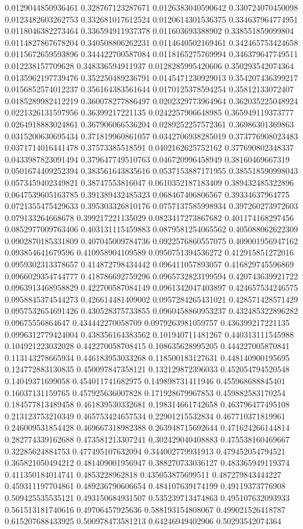 \begin{table}
\begin{tabu}
\begin{sparkline}{10}
0.0129044850936461 0.328767123287671 0.0126383040590642 0.330724070450098 0.0123482603262753 0.332681017612524 0.0120614301536375 0.334637964774951 0.0118046382273464 0.336594911937378 0.011603693388902 0.338551859099804 0.0114827867678204 0.340508806262231 0.0114640502169461 0.342465753424658 0.0115672659593896 0.344422700587084 0.0118165275769994 0.346379647749511 0.012238157709628 0.348336594911937 0.0128285995420606 0.350293542074364 0.0135962197739476 0.352250489236791 0.0145471230929013 0.354207436399217 0.0156852574012237 0.356164383561644 0.0170125378594254 0.35812133072407 0.0185289982412219 0.360078277886497 0.0202329773964964 0.362035225048924 0.0221326131597956 0.36399217221135 0.0242257906648985 0.365949119373777 0.0264918883024861 0.367906066536204 0.0289252257572361 0.36986301369863 0.0315200630695434 0.371819960861057 0.0342706938285019 0.373776908023483 0.0371714016441478 0.37573385518591 0.0402162625752162 0.377690802348337 0.0433987823091494 0.379647749510763 0.046720996458949 0.38160469667319 0.0501674409252394 0.383561643835616 0.0537153887171955 0.385518590998043 0.0573459402349821 0.38747553816047 0.0610352187183409 0.389432485322896 0.0647539605163785 0.391389432485323 0.068467406806567 0.39334637964775 0.0721355475429633 0.395303326810176 0.0757137585998934 0.397260273972603 0.079133264668678 0.399217221135029 0.0823417273867682 0.401174168297456 0.0852977009763406 0.403131115459883 0.0879581254065562 0.405088062622309 0.0902870185331809 0.407045009784736 0.0922576860557075 0.409001956947162 0.093854641679596 0.410958904109589 0.0950751394536272 0.412915851272016 0.0959302313378657 0.414872798434442 0.096411057893057 0.416829745596869 0.0966029354744777 0.418786692759296 0.0965732823199594 0.420743639921722 0.0963913468958829 0.422700587084149 0.0961342047403897 0.424657534246575 0.0958845374544273 0.426614481409002 0.0957284265431021 0.428571428571429 0.0957532654691426 0.430528375733855 0.0960458860953237 0.432485322896282 0.09675556864647 0.434442270058709 0.0979263981059757 0.436399217221135 0.0996312779424004 0.438356164383562 0.101940711481267 0.440313111545988 0.104921223032028 0.442270058708415 0.108635628995205 0.444227005870841 0.113143278665934 0.446183953033268 0.118500183127631 0.448140900195695 0.124772883130835 0.450097847358121 0.132129872396033 0.452054794520548 0.14049371699058 0.454011741682975 0.149898731411946 0.455968688845401 0.16037131159765 0.457925636007828 0.171928679967853 0.459882583170254 0.184577813489458 0.461839530332681 0.198314661742658 0.463796477495108 0.213123753210349 0.465753424657534 0.22901215532834 0.467710371819961 0.246009531854428 0.469667318982388 0.263948715692644 0.471624266144814 0.282774339162688 0.473581213307241 0.302429040408883 0.475538160469667 0.32285624884753 0.477495107632094 0.344002779931913 0.479452054794521 0.365821050494212 0.481409001956947 0.388270733036127 0.483365949119374 0.411350184014741 0.4853228962818 0.435053875699511 0.487279843444227 0.459311197704861 0.489236790606654 0.484107639174199 0.49119373776908 0.509425535535121 0.493150684931507 0.535239713474863 0.495107632093933 0.561513181740616 0.49706457925636 0.588193154808067 0.499021526418787 0.615207688433925 0.500978473581213 0.64246949402906 0.50293542074364 
\end{sparkline}
\end{tabu}
\end{table}
